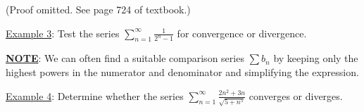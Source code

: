 \documentclass[paper=a4, fontsize=11pt]{scrartcl} %
\numberwithin{equation}{section} %
\numberwithin{figure}{section} %
\numberwithin{table}{section} %
\newcommand{\ds}{\displaystyle}
\begin{document}
  (Proof omitted. See page 724 of textbook.)\\
  \indent
  
  \underline{Example 3}: Test the series $\ds\sum_{n=1}^\infty \ds\frac{1}{2^n-1}$ for convergence or divergence.\\
  \indent
  
  \vspace{3in}
  
  \newpage
  
    \textbf{\underline{NOTE}}: We can often find a suitable comparison series $\ds\sum b_n$ by keeping only the highest powers in the numerator and denominator and simplifying the expression.\\
  \indent
  
  \underline{Example 4}: Determine whether the series $\ds\sum_{n=1}^\infty \ds\frac{2n^2+3n}{\ds\sqrt{5+n^5}}$ converges or diverges.\\
  \indent
  
  \vspace{4in}
  

\end{document}
